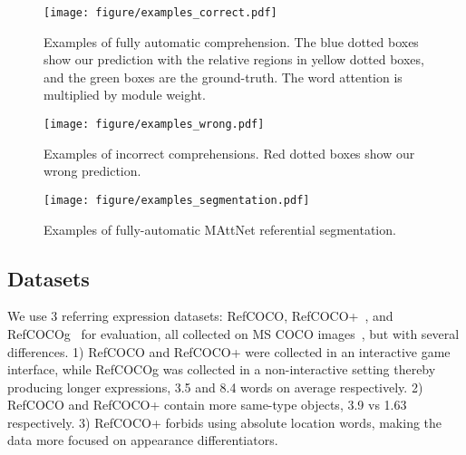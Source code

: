\begin{table*}[t]
\begin{center}
\end{center}
\vspace{-10pt}
\caption{Comparison of segmentation performance on RefCOCO, RefCOCO+, and our results on RefCOCOg.}
\label{table:comprehension_segmentation}
\end{table*}


\begin{figure*}[t]
\texttt{[image: figure/examples\_correct.pdf]}
\caption{Examples of fully automatic comprehension. The blue dotted boxes show our prediction with the relative regions in yellow dotted boxes, and the green boxes are the ground-truth. The word attention is multiplied by module weight.}
\label{fig:examples_correct}
\end{figure*}

\begin{figure}[t]
\texttt{[image: figure/examples\_wrong.pdf]}
\caption{Examples of incorrect comprehensions. 
Red dotted boxes show our wrong prediction.
}
\label{fig:examples_wrong}
\end{figure}

\begin{figure}[t]
\texttt{[image: figure/examples\_segmentation.pdf]}
\caption{Examples of fully-automatic MAttNet referential segmentation. 
}
\label{fig:examples_segmentation}
\end{figure}



\subsection{Datasets}
\vspace{-.1cm}
We use 3 referring expression datasets: RefCOCO, RefCOCO+~\cite{kazemzadeh2014referitgame}, and RefCOCOg~\cite{mao2015generation} for evaluation, all collected on MS COCO images~\cite{lin2014microsoft}, but with several differences.
1) RefCOCO and RefCOCO+ were collected in an interactive game interface, while RefCOCOg was collected in a non-interactive setting thereby producing longer expressions, 3.5 and 8.4 words on average respectively.
2) RefCOCO and RefCOCO+ contain more same-type objects, 3.9 vs 1.63 respectively.
3) RefCOCO+ forbids using absolute location words, making the data more focused on appearance differentiators.

